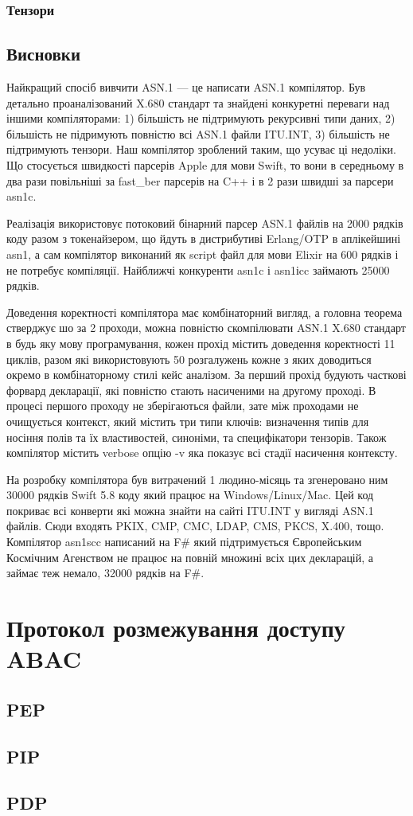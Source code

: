 \subsubsection{Тензори}

\newpage
\subsection{Висновки}

Найкращий спосіб вивчити ASN.1 — це написати ASN.1 компілятор. Був детально проаналізований X.680 стандарт та знайдені конкуретні переваги над іншими компіляторами: 1) більшість не підтримують рекурсивні типи даних, 2) більшість не підримують повністю всі ASN.1 файли ITU.INT, 3) більшість не підтримують тензори. Наш компілятор зроблений таким, що усуває ці недоліки. Що стосується швидкості парсерів Apple для мови Swift, то вони в середньому в два рази повільніші за fast_ber парсерів на C++ і в 2 рази швидші за парсери asn1c.

Реалізація використовує потоковий бінарний парсер ASN.1 файлів на 2000 рядків коду разом з токенайзером, що йдуть в дистрибутиві Erlang/OTP в аплікейшині asn1, а сам компілятор виконаний як script файл для мови Elixir на 600 рядків і не потребує компіляції. Найближчі конкуренти asn1c і asn1іcc займають 25000 рядків.

Доведення коректності компілятора має комбінаторний вигляд, а головна теорема стверджує шо за 2 проходи, можна повністю скомпілювати ASN.1 X.680 стандарт в будь яку мову програмування, кожен прохід містить доведення коректності 11 циклів, разом які використовують 50 розгалужень кожне з яких доводиться окремо в комбінаторному стилі кейс аналізом. За перший прохід будують часткові форвард декларації, які повністю стають насиченими на другому проході. В процесі першого проходу не зберігаються файли, зате між проходами не очищується контекст, який містить три типи ключів: визначення типів для носіння полів та їх властивостей, синоніми, та специфікатори тензорів. Також компілятор містить verbose опцію -v яка показує всі стадії насичення контексту.

На розробку компілятора був витрачений 1 людино-місяць та згенеровано ним 30000 рядків Swift 5.8 коду який працює на Windows/Linux/Mac. Цей код покриває всі конверти які можна знайти на сайті ITU.INT у вигляді ASN.1 файлів. Сюди входять PKIX, CMP, CMC, LDAP, CMS, PKCS, X.400, тощо. Компілятор asn1scc написаний на F# який підтримується Європейським Космічним Агенством не працює на повній множині всіх цих декларацій, а займає теж немало, 32000 рядків на F#.


\section{Протокол розмежування доступу ABAC}

\subsection{PEP}
\subsection{PIP}
\subsection{PDP}
